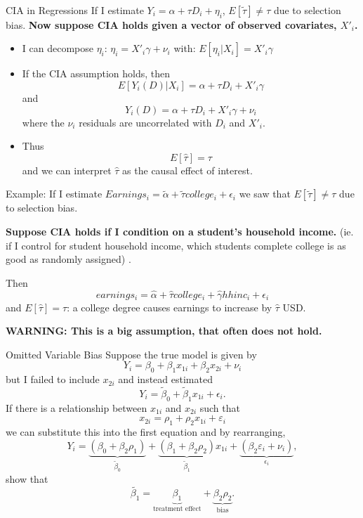 \documentclass[
  ignorenonframetext,
]{beamer}
\begin{document}
\begin{frame}{CIA in Regressions}
\protect\hypertarget{cia-in-regressions}{}
If I estimate \(Y_i=\alpha+\tau D_i +\eta_i\),
\(E[\tilde{\tau}]\neq \tau\) due to selection bias. \textbf{Now suppose
CIA holds given a vector of observed covariates, \(X'_i\).}

\begin{itemize}
\item
  I can decompose \(\eta_i\): \(\eta_i=X'_i\gamma+\nu_i\) with:
  \(E[\eta_i|X_i]=X'_i\gamma\)
\item
  If the CIA assumption holds, then \[
  E[Y_i(D)|X_i]=\alpha+\tau D_i+X'_i \gamma
  \] and \[
  Y_i(D)=\alpha+\tau D_i+X'_i \gamma+\nu_i
  \] where the \(\nu_i\) residuals are uncorrelated with \(D_i\) and
  \(X'_i\).
\item
  Thus \[
  E[\hat{\tau}]=\tau
  \] and we can interpret \(\hat{\tau}\) as the causal effect of
  interest.
\end{itemize}
\end{frame}

\begin{frame}{Example:}
\protect\hypertarget{example-2}{}
If I estimate
\(Earnings_i=\tilde{\alpha}+\tilde{\tau}college_i+\epsilon_i\) we saw
that \(E[\tilde{\tau}]\neq\tau\) due to selection bias.

\textbf{Suppose CIA holds if I condition on a student's household
income.} (ie. if I control for student household income, which students
complete college is as good as randomly assigned) .

Then \[
earnings_i=\hat{\alpha}+\hat{\tau}college_i+\hat{\gamma}hhinc_i+\epsilon_i
\] and \(E[\hat{\tau}]=\tau\): a college degree causes earnings to
increase by \(\hat{\tau}\) USD.

\textbf{WARNING: This is a big assumption, that often does not hold.}
\end{frame}

\begin{frame}{Omitted Variable Bias}
\protect\hypertarget{omitted-variable-bias}{}
Suppose the true model is given by \[
Y_i=\beta_0+\beta_1 x_{1i}+\beta_2 x_{2i}+\nu_i
\] but I failed to include \(x_{2i}\) and instead estimated \[
Y_i=\tilde{\beta}_0+\tilde{\beta}_1 x_{1i}+\epsilon_i.
\] If there is a relationship between \(x_{1i}\) and \(x_{2i}\) such
that \[
x_{2i}=\rho_1+\rho_2 x_{1i}+\varepsilon_i
\] we can substitute this into the first equation and by rearranging, \[
Y_i=\underbrace{(\beta_0+\beta_2\rho_1)}_{\tilde{\beta}_0}+\underbrace{(\beta_1+\beta_2 \rho_2)}_{\tilde{\beta}_1} x_{1i}+\underbrace{(\beta_2 \varepsilon_i+\nu_i)}_{\epsilon_i},
\] show that \[
\tilde{\beta_1}=\underbrace{\beta_1}_\text{treatment effect}+\underbrace{\beta_2 \rho_2}_\text{bias}.
\]
\end{frame}
\end{document}
